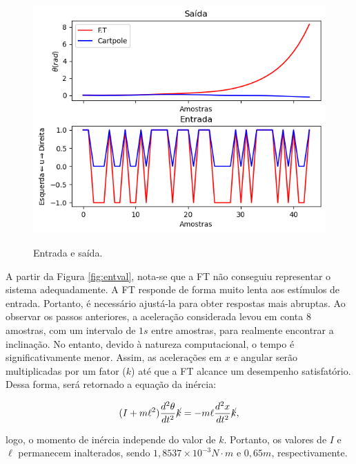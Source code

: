 \documentclass[12pt,           %
a4paper,                       %
openany,                       %
oneside,                       %
chapter=TITLE,                 %
english,                       %
spanish,                       %
brazil,                        %
sumario=tradicional]{abntex2}  %
\begin{document}
\begin{OnehalfSpace}
\begin{figure}[H]
     \centering
     \vspace*{-0.2cm}
     \caption{Entrada e saída.}
     \includegraphics[scale=.6]{entval.png}
     \label{fcte}
\end{figure}
\label{fig:entval}
\vspace*{-.85cm}
{\raggedright {}}


A partir da Figura \ref{fig:entval}, nota-se que a FT não conseguiu representar o sistema adequadamente. A FT responde de forma muito lenta aos estímulos de entrada. Portanto, é necessário ajustá-la para obter respostas mais abruptas. Ao observar os passos anteriores, a aceleração considerada levou em conta $8$ amostras, com um intervalo de $1s$ entre amostras, para realmente encontrar a inclinação. No entanto, devido à natureza computacional, o tempo é significativamente menor. Assim, as acelerações em $x$ e angular serão multiplicadas por um fator ($k$) até que a FT alcance um desempenho satisfatório. Dessa forma, será retornado a equação da inércia:

\begin{equation}
    (I + m\ell^2)\frac{d^2\theta}{dt^2}\cancel{k}   = - m\ell\frac{d^2x}{dt^2} \cancel{k},
    \label{eq:inercia}
\end{equation}

\noindent logo, o momento de inércia independe do valor de \(k\). Portanto, os valores de \(I\) e \(\ell\) permanecem inalterados, sendo \(1,8537\times 10^{-3} N\cdot m\) e \(0,65 m\), respectivamente.


\end{OnehalfSpace}
\end{document}
